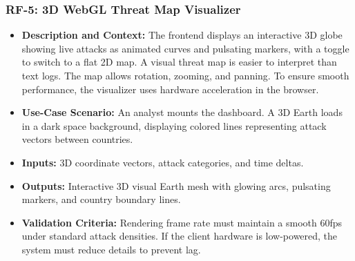 \subsubsection{RF-5: 3D WebGL Threat Map Visualizer}
\begin{itemize}
    \item \textbf{Description and Context:} The frontend displays an interactive 3D globe showing live attacks as animated curves and pulsating markers, with a toggle to switch to a flat 2D map. A visual threat map is easier to interpret than text logs. The map allows rotation, zooming, and panning. To ensure smooth performance, the visualizer uses hardware acceleration in the browser.
    \item \textbf{Use-Case Scenario:} An analyst mounts the dashboard. A 3D Earth loads in a dark space background, displaying colored lines representing attack vectors between countries.
    \item \textbf{Inputs:} 3D coordinate vectors, attack categories, and time deltas.
    \item \textbf{Outputs:} Interactive 3D visual Earth mesh with glowing arcs, pulsating markers, and country boundary lines.
    \item \textbf{Validation Criteria:} Rendering frame rate must maintain a smooth 60fps under standard attack densities. If the client hardware is low-powered, the system must reduce details to prevent lag.
\end{itemize}

